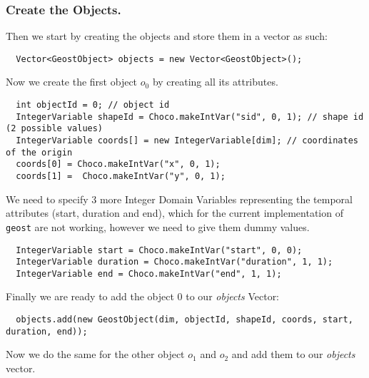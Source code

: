 \subsubsection{Create the Objects.}\label{geostdescription:createtheobjects}\hypertarget{geostdescription:createtheobjects}{}
Then we start by creating the objects and store them in a vector as such:
\begin{lstlisting}
  Vector<GeostObject> objects = new Vector<GeostObject>();
\end{lstlisting}
Now we create the first object $o_0$ by creating all its attributes.
\begin{lstlisting}
  int objectId = 0; // object id
  IntegerVariable shapeId = Choco.makeIntVar("sid", 0, 1); // shape id (2 possible values)
  IntegerVariable coords[] = new IntegerVariable[dim]; // coordinates of the origin 
  coords[0] = Choco.makeIntVar("x", 0, 1);  
  coords[1] =  Choco.makeIntVar("y", 0, 1);
\end{lstlisting}
We need to specify 3 more Integer Domain Variables representing the temporal attributes (start, duration and end), which for the current implementation of \texttt{geost} are not working, however we need to give them dummy values. 
\begin{lstlisting}
  IntegerVariable start = Choco.makeIntVar("start", 0, 0);
  IntegerVariable duration = Choco.makeIntVar("duration", 1, 1);
  IntegerVariable end = Choco.makeIntVar("end", 1, 1);
\end{lstlisting}
Finally we are ready to add the object 0 to our \emph{objects} Vector:
\begin{lstlisting}
  objects.add(new GeostObject(dim, objectId, shapeId, coords, start, duration, end));
\end{lstlisting}
Now we do the same for the other  object $o_1$  and  $o_2$ and add them to our \emph{objects} vector.


